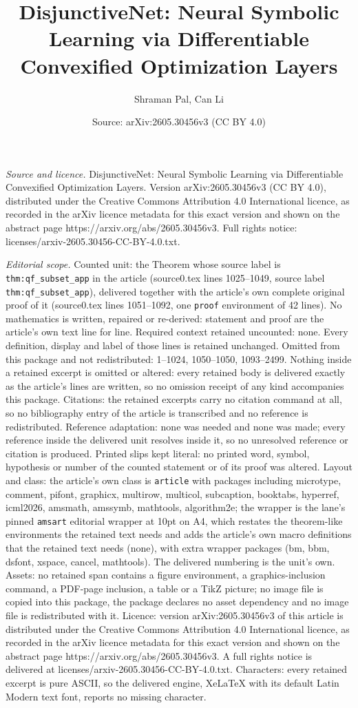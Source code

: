 \documentclass[10pt,a4paper]{amsart}
\title[DisjunctiveNet: Neural Symbolic Learning via Differentiable ]{DisjunctiveNet: Neural Symbolic Learning via Differentiable Convexified Optimization Layers}
\author{Shraman Pal, Can Li}
\date{Source: arXiv:2605.30456v3 (CC BY 4.0)}
\begin{document}
\maketitle

\noindent\emph{Source and licence.} DisjunctiveNet: Neural Symbolic Learning via Differentiable Convexified Optimization Layers. Version arXiv:2605.30456v3 (CC BY 4.0), distributed under the Creative Commons Attribution 4.0 International licence, as recorded in the arXiv licence metadata for this exact version and shown on the abstract page https://arxiv.org/abs/2605.30456v3. Full rights notice: licenses/arxiv-2605.30456-CC-BY-4.0.txt.\par\smallskip

\noindent\textit{Editorial scope.} Counted unit: the Theorem whose source label is \texttt{thm:qf\_subset\_app} in the article (source0.tex lines 1025--1049, source label \texttt{thm:qf\_subset\_app}), delivered together with the article's own complete original proof of it (source0.tex lines 1051--1092, one \texttt{proof} environment of 42 lines). No mathematics is written, repaired or re-derived: statement and proof are the article's own text line for line. Required context retained uncounted: none. Every definition, display and label of those lines is retained unchanged. Omitted from this package and not redistributed: 1--1024, 1050--1050, 1093--2499. Nothing inside a retained excerpt is omitted or altered: every retained body is delivered exactly as the article's lines are written, so no omission receipt of any kind accompanies this package. Citations: the retained excerpts carry no citation command at all, so no bibliography entry of the article is transcribed and no reference is redistributed. Reference adaptation: none was needed and none was made; every reference inside the delivered unit resolves inside it, so no unresolved reference or citation is produced. Printed slips kept literal: no printed word, symbol, hypothesis or number of the counted statement or of its proof was altered. Layout and class: the article's own class is \texttt{article} with packages including microtype, comment, pifont, graphicx, multirow, multicol, subcaption, booktabs, hyperref, icml2026, amsmath, amssymb, mathtools, algorithm2e; the wrapper is the lane's pinned \texttt{amsart} editorial wrapper at 10pt on A4, which restates the theorem-like environments the retained text needs and adds the article's own macro definitions that the retained text needs (none), with extra wrapper packages (bm, bbm, dsfont, xspace, cancel, mathtools). The delivered numbering is the unit's own. Assets: no retained span contains a figure environment, a graphics-inclusion command, a PDF-page inclusion, a table or a TikZ picture; no image file is copied into this package, the package declares no asset dependency and no image file is redistributed with it. Licence: version arXiv:2605.30456v3 of this article is distributed under the Creative Commons Attribution 4.0 International licence, as recorded in the arXiv licence metadata for this exact version and shown on the abstract page https://arxiv.org/abs/2605.30456v3. A full rights notice is delivered at licenses/arxiv-2605.30456-CC-BY-4.0.txt. Characters: every retained excerpt is pure ASCII, so the delivered engine, XeLaTeX with its default Latin Modern text font, reports no missing character.
\end{document}
